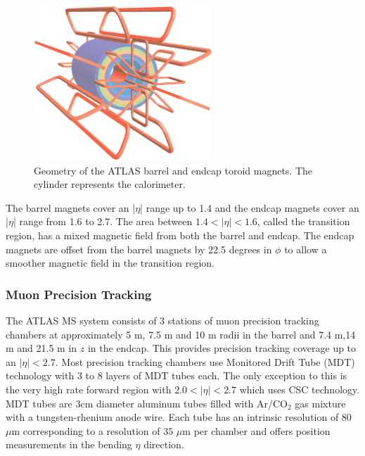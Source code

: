 \begin{figure}[h!]
\centering
\includegraphics[width=0.60\textwidth, angle=270]{figures/LHC_ATLAS/ATLcoilGeom.eps}
\caption[~Geometry of the ATLAS barrel and endcap toroid magnets]{ Geometry of the ATLAS barrel and endcap toroid magnets. The cylinder represents the calorimeter.\cite{ATLAS_JINST} \label{LHC:fig:ATLASMag}}
\end{figure}

\indent The barrel magnets cover an |$\eta$| range up to 1.4 and the endcap magnets cover an |$\eta$| range from 1.6 to 2.7. The area between $1.4 < |\eta| < 1.6$, called the transition region, has a mixed magnetic field from both the barrel and endcap. The endcap magnets are offset from the barrel magnets by 22.5 degrees in $\phi$ to allow a smoother magnetic field in the transition region. \\

\subsubsection*{Muon Precision Tracking}

\indent The ATLAS MS system consists of 3 stations of muon precision tracking chambers at approximately 5 m, 7.5 m and 10 m radii in the barrel and 7.4 m,14 m and 21.5 m in $z$ in the endcap.  This provides precision tracking coverage up to an $|\eta| < 2.7$.  Most precision tracking chambers use Monitored Drift Tube (MDT) technology with 3 to 8 layers of MDT tubes each.  The only exception to this is the very high rate forward region with $2.0 < |\eta| < 2.7$ which uses CSC technology. \\

\indent  MDT tubes are 3cm diameter aluminum tubes filled with Ar/CO$_2$ gas mixture with a tungsten-rhenium anode wire.  Each tube has an intrinsic resolution of 80 $\mu$m corresponding to a resolution of $35$ $\mu$m per chamber and offers position measurements in the bending $\eta$ direction.  \\

